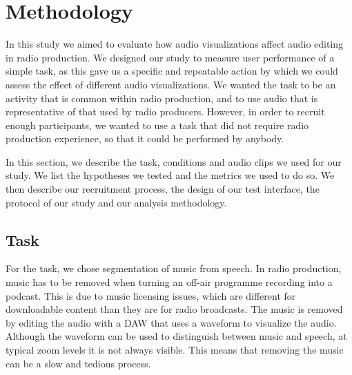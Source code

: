 


\section{Methodology}\label{sec:vis-method}

In this study we aimed to evaluate how audio visualizations affect audio editing in radio production.  We designed our
study to measure user performance of a simple task, as this gave us a specific and repeatable action by which we could
assess the effect of different audio visualizations.  We wanted the task to be an activity that is common within radio
production, and to use audio that is representative of that used by radio producers.  However, in order to recruit
enough participants, we wanted to use a task that did not require radio production experience, so that it could be
performed by anybody.

In this section, we describe the task, conditions and audio clips we used for our study. We list the hypotheses we
tested and the metrics we used to do so. We then describe our recruitment process, the design of our test interface,
the protocol of our study and our analysis methodology. 

\subsection{Task}
For the task, we chose segmentation of music from speech.
In radio production, music has to be removed 
when turning an off-air programme recording into a podcast. This is due to music licensing issues, which are different
for downloadable content than they are for radio broadcasts. The music is removed by editing the audio with a DAW that uses a waveform to
visualize the audio. Although the waveform can be used to distinguish between music and speech, at typical zoom levels
it is not always visible. This means that removing the music can be a slow and tedious process.

